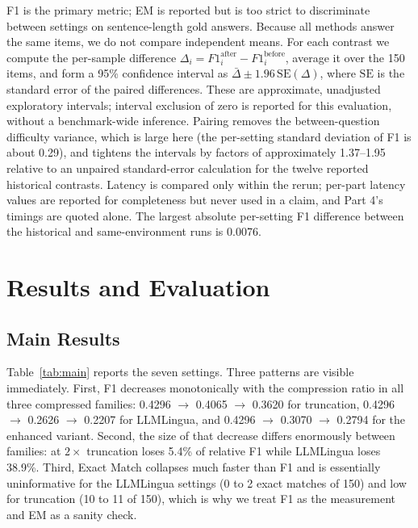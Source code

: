 \documentclass[10pt,a4paper,twocolumn]{article}
\begin{document}
F1 is the primary metric; EM is reported but is too strict to discriminate
between settings on sentence-length gold answers. Because all methods answer the
same items, we do not compare independent means. For each contrast we compute the
per-sample difference $\Delta_i = F1^{\text{after}}_i - F1^{\text{before}}_i$,
average it over the 150 items, and form a 95\% confidence interval as
$\bar{\Delta} \pm 1.96\,\mathrm{SE}(\Delta)$, where $\mathrm{SE}$ is the standard
error of the paired differences. These are approximate, unadjusted exploratory intervals; interval exclusion of zero is reported for this evaluation, without a benchmark-wide inference. Pairing removes the between-question difficulty variance,
which is large here (the per-setting standard deviation of F1 is about 0.29), and
tightens the intervals by factors of approximately 1.37--1.95 relative to an unpaired standard-error calculation for the twelve reported historical contrasts. Latency is compared only within the rerun; per-part latency
values are reported for completeness but never used in a claim, and Part 4's
timings are quoted alone. The largest absolute per-setting F1 difference between the historical and same-environment runs is 0.0076.

\section{Results and Evaluation}

\subsection{Main Results}

Table~\ref{tab:main} reports the seven settings. Three patterns are visible
immediately. First, F1 decreases monotonically with the compression ratio in all
three compressed families: 0.4296 $\rightarrow$ 0.4065 $\rightarrow$ 0.3620 for
truncation, 0.4296 $\rightarrow$ 0.2626 $\rightarrow$ 0.2207 for LLMLingua, and
0.4296 $\rightarrow$ 0.3070 $\rightarrow$ 0.2794 for the enhanced variant. Second,
the size of that decrease differs enormously between families: at $2\times$
truncation loses 5.4\% of relative F1 while LLMLingua loses 38.9\%. Third, Exact
Match collapses much faster than F1 and is essentially uninformative for the LLMLingua settings (0 to 2 exact matches of 150) and low for truncation (10 to 11 of 150), which is why we treat F1 as the
measurement and EM as a sanity check.
\end{document}
